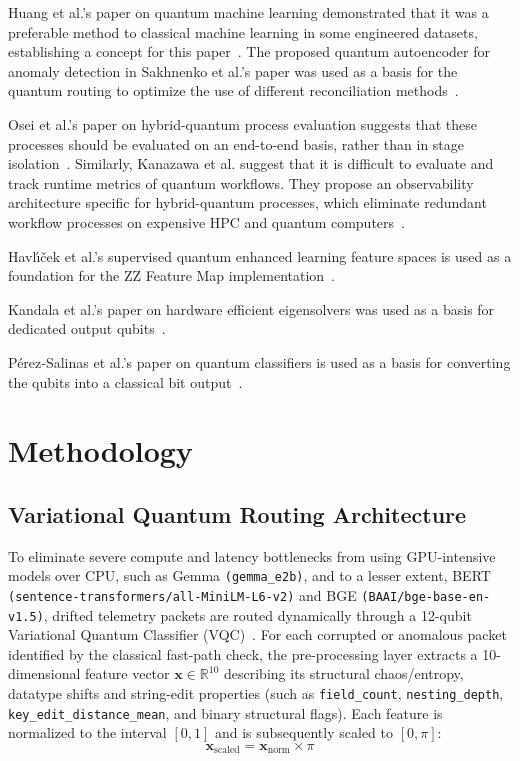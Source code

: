 \documentclass[journal]{IEEEtran}
\begin{document}
Huang et al.'s paper on quantum machine learning demonstrated that it was a preferable method to classical machine learning in some engineered datasets, establishing a concept for this paper~\cite{Huang_2021}. The proposed quantum autoencoder for anomaly detection in Sakhnenko et al.'s paper was used as a basis for the quantum routing to optimize the use of different reconciliation methods~\cite{Sakhnenko_2022}. 

Osei et al.'s paper on hybrid-quantum process evaluation suggests that these processes should be evaluated on an end-to-end basis, rather than in stage isolation~\cite{OseiHPE}. Similarly, Kanazawa et al. suggest that it is difficult to evaluate and track runtime metrics of quantum workflows. They propose an observability architecture specific for hybrid-quantum processes, which eliminate redundant workflow processes on expensive HPC and quantum computers~\cite{KanazawaObservability}.

Havl{\'\i}{\v{c}}ek et al.'s supervised quantum enhanced learning feature spaces is used as a foundation for the ZZ Feature Map implementation~\cite{Havlicek_2019}.

Kandala et al.'s paper on hardware efficient eigensolvers was used as a basis for dedicated output qubits~\cite{Kandala_2017}.

Pérez-Salinas et al.'s paper on quantum classifiers is used as a basis for converting the qubits into a classical bit output~\cite{P_rez_Salinas_2020}.


\section{Methodology}
\subsection{Variational Quantum Routing Architecture}
To eliminate severe compute and latency bottlenecks from using GPU-intensive models over CPU, such as Gemma \texttt{(gemma\_e2b)}, and to a lesser extent, BERT \texttt{(sentence-transformers/all-MiniLM-L6-v2)} and BGE \texttt{(BAAI/bge-base-en-v1.5)}, drifted telemetry packets are routed dynamically through a 12-qubit Variational Quantum Classifier (VQC)~\cite{Havlicek_2019}.
For each corrupted or anomalous packet identified by the classical fast-path check, the pre-processing layer extracts a 10-dimensional feature vector $\mathbf{x} \in \mathbb{R}^{10}$ describing its structural chaos/entropy, datatype shifts and string-edit properties (such as \texttt{field\_count}, \texttt{nesting\_depth}, \texttt{key\_edit\_distance\_mean}, and binary structural flags). Each feature is normalized to the interval $[0,1]$ and is subsequently scaled to $[0, \pi]$:
\begin{equation}
\mathbf{x}_{\text{scaled}} = \mathbf{x}_{\text{norm}} \times \pi
\end{equation}
\end{document}
